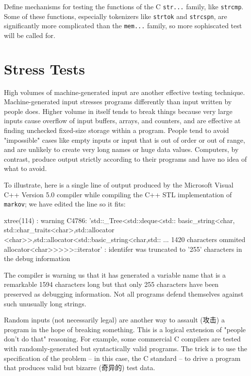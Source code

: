 \begin{exercise}
    Define mechanisms for testing the functions of the C \verb'str...'
    family, like \verb'strcmp'. Some of these functions, especially
    tokenizers like \verb'strtok' and \verb'strcspn', are significantly
    more complicated than the \verb'mem...' family, so more sophiscated
    test will be called for.
\end{exercise}

\section{Stress Tests}
\label{sec:stress_tests}

High volumes of machine-generated input are another effective testing
technique.  Machine-generated input stresses programs differently than
input written by people does. Higher volume in itself tends to break things
because very large inputs cause overflow of input buffers, arrays, and
counters, and are effective at finding unchecked fixed-size storage within
a program. People tend to avoid "impossible" cases like empty inputs or
input that is out of order or out of range, and are unlikely to create very
long names or huge data values. Computers, by contrast, produce output
strictly according to their programs and have no idea of what to avoid.

To illustrate, here is a single line of output produced by the Microsoft
Visual C++ Version 5.0 compiler while compiling the C++ STL implementation
of \texttt{markov}; we have edited the line so it fits:
\begin{wellcode}
    xtree(114) : warning C4786: 'std::_Tree<std::deque<std::
    basic_string<char, std::char_traits<char>,std::allocator
    <char>>,std::allocator<std::basic_string<char,std::
    ... 1420 characters ommited
    allocator<char>>>>>::iterator' : identifer was
    truncated to '255' characters in the debug information
\end{wellcode}
The compiler is warning us that it has generated a variable name that is a
remarkable 1594 characters long but that only 255 characters have been
preserved as debugging information. Not all programs defend themselves
against such unusually long strings.

Random inputs (not necessarily legal) are another way to assault (攻击) a
program in the hope of breaking something. This is a logical extension of
"people don't do that" reasoning. For example, some commercial C compilers
are tested with randomly-generated but syntactically valid programs. The
trick is to use the specification of the problem -- in this case, the C
standard -- to drive a program that produces valid but bizarre (奇异的)
test data.

